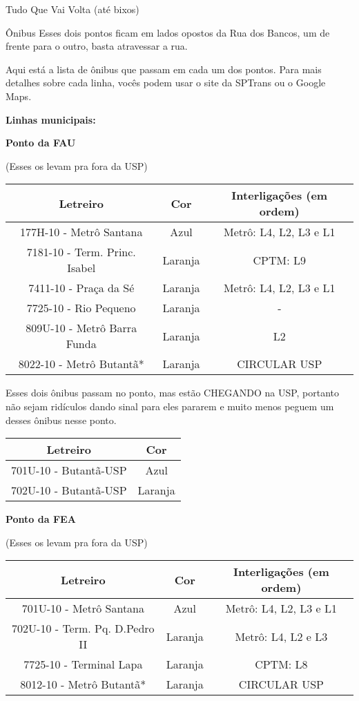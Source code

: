 \begin{secao}{Tudo Que Vai Volta (até bixos)}
\begin{subsecao}{Ônibus}
Esses dois pontos ficam em lados opostos da Rua dos Bancos, um de frente para o
outro, basta atravessar a rua.

Aqui está a lista de ônibus que passam em cada um dos pontos. Para mais detalhes
sobre cada linha, vocês podem usar o site da SPTrans ou o Google Maps.

{\bf Linhas municipais:}

{\bf Ponto da FAU}

(Esses os levam pra fora da USP)
\begin{center}
	\begin{tabular}{|c|c|c|}
      \hline
	  Letreiro & Cor & Interligações (em ordem)\\
	  \hline
	  177H-10 - Metrô Santana & Azul & Metrô: L4, L2, L3 e L1\\
	  7181-10 - Term. Princ. Isabel & Laranja & CPTM: L9\\
	  7411-10 - Praça da Sé & Laranja & Metrô: L4, L2, L3 e L1\\
	  7725-10 - Rio Pequeno & Laranja & - \\
	  809U-10 - Metrô Barra Funda & Laranja & L2 \\
	  8022-10 - Metrô Butantã* & Laranja & CIRCULAR USP\\
      \hline
	\end{tabular}
\end{center}

Esses dois ônibus passam no ponto, mas estão CHEGANDO na USP, portanto não sejam
ridículos dando sinal para eles pararem e muito menos peguem um desses ônibus
nesse ponto.

\begin{center}
	\begin{tabular}{|c|c|}
	  \hline
	  Letreiro & Cor\\
	  \hline
	  701U-10 - Butantã-USP & Azul\\
	  702U-10 - Butantã-USP & Laranja\\
	  \hline
	\end{tabular}
\end{center}

{\bf Ponto da FEA}

(Esses os levam pra fora da USP)
\begin{center}
	\begin{tabular}{|c|c|c|}
      \hline
	  Letreiro & Cor & Interligações (em ordem)\\
	  \hline
	  701U-10 - Metrô Santana & Azul & Metrô: L4, L2, L3 e L1\\
	  702U-10 - Term. Pq. D.Pedro II & Laranja & Metrô: L4, L2 e L3\\
	  7725-10 - Terminal Lapa & Laranja & CPTM: L8\\
	  8012-10 - Metrô Butantã* & Laranja & CIRCULAR USP\\
      \hline
	\end{tabular}
\end{center}


\end{subsecao}
\end{secao}
